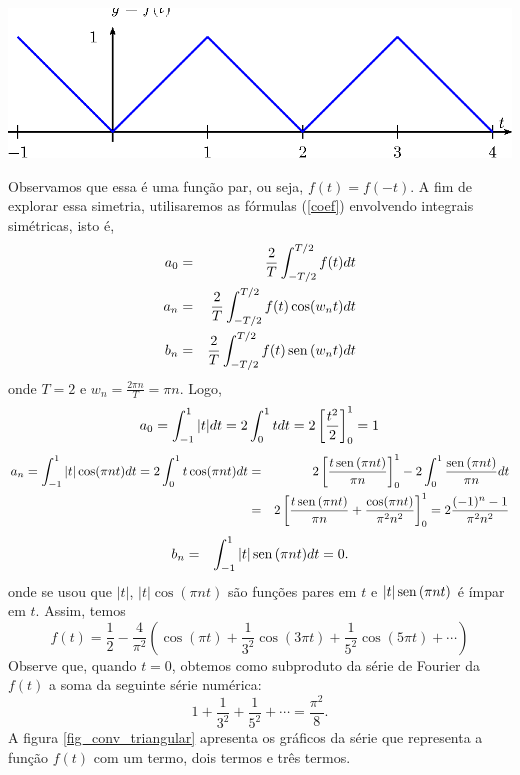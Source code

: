 \begin{ex}
\begin{center}
\includegraphics{cap_series/pics/figura_1}\end{center}
Observamos que essa é uma função par, ou seja, $f(t)=f(-t)$. A fim de explorar essa simetria, utilisaremos as fórmulas (\ref{coef}) envolvendo integrais simétricas, isto é,
  \begin{eqnarray*}
   a_0&=& \frac{2}{T}\int_{-T/2}^{T/2} f(t)dt\\
   a_n&=&  \frac{2}{T}\int_{-T/2}^{T/2} f(t)\cos(w_nt)dt\\
   b_n&=&\frac{2}{T}\int_{-T/2}^{T/2} f(t)\operatorname{sen}\,(w_nt)dt
  \end{eqnarray*}
onde $T=2$ e $w_n=\frac{2\pi n}{T}=\pi n$. Logo,
  \begin{equation*}
   a_0= \int_{-1}^{1} |t| dt=2\int_{0}^{1} t dt=2\left[\frac{t^2}{2}\right]_0^1=1\\
	\end{equation*}
	\begin{eqnarray*}
   a_n=  \int_{-1}^{1} |t|\cos(\pi n t)dt=2 \int_{0}^{1} t\cos(\pi n t)dt&=&2\left[\frac{t\operatorname{sen}\,(\pi n t)}{\pi n}\right]_0^1-2\int_0^1\frac{\operatorname{sen}\,(\pi n t)}{\pi n}dt\\
	&=&2\left[\frac{t\operatorname{sen}\,(\pi n t)}{\pi n}+\frac{\cos(\pi n t)}{\pi^2 n^2}\right]_0^1=2\frac{(-1)^n-1}{\pi^2n^2}\\
	 \end{eqnarray*}
	\begin{eqnarray*}
   b_n&=&\int_{-1}^{1} |t|\operatorname{sen}\,(\pi n t)dt=0.
  \end{eqnarray*}
onde se usou que $|t|$, $|t|\cos(\pi n t)$ são funções pares em $t$ e $|t|\operatorname{sen}\,(\pi n t)$ é ímpar em $t$. Assim, temos
$$
f(t)=\frac{1}{2}-\frac{4}{\pi^2}\left(\cos(\pi t)+\frac{1}{3^2}\cos(3\pi t)+\frac{1}{5^2}\cos(5\pi t)+\cdots\right)
$$
Observe que, quando $t=0$, obtemos como subproduto da série de Fourier da $f(t)$ a soma da seguinte série numérica:
\begin{equation}\label{serie_inv_impar}
1+\frac{1}{3^2}+\frac{1}{5^2}+\cdots=\frac{\pi^2}{8}.
\end{equation}
A figura \ref{fig_conv_triangular} apresenta os gráficos da série que representa a função $f(t)$ com um termo, dois termos e três termos.
\begin{figure}[!ht]
\begin{center}


\end{center}
\end{figure}
\end{ex}
